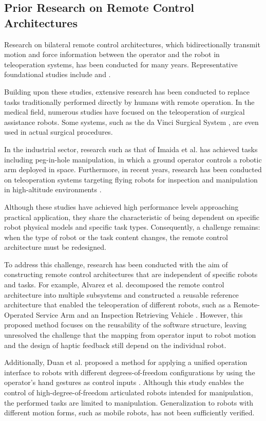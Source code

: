 \documentclass{WileyMSP-template}
\begin{document}
\subsection{Prior Research on Remote Control Architectures}

Research on bilateral remote control architectures, which bidirectionally transmit motion and force information between the operator and the robot in teleoperation systems, has been conducted for many years.
Representative foundational studies include \cite{hokayem} and \cite{anderson}.

Building upon these studies, extensive research has been conducted to replace tasks traditionally performed directly by humans with remote operation.
In the medical field, numerous studies have focused on the teleoperation of surgical assistance robots.
Some systems, such as the da Vinci Surgical System \cite{freschi}, are even used in actual surgical procedures.

In the industrial sector, research such as that of Imaida et al. \cite{imaida} has achieved tasks including peg-in-hole manipulation, in which a ground operator controls a robotic arm deployed in space.
Furthermore, in recent years, research has been conducted on teleoperation systems targeting flying robots for inspection and manipulation in high-altitude environments \cite{hou}.

Although these studies have achieved high performance levels approaching practical application, they share the characteristic of being dependent on specific robot physical models and specific task types.
Consequently, a challenge remains: when the type of robot or the task content changes, the remote control architecture must be redesigned.

To address this challenge, research has been conducted with the aim of constructing remote control architectures that are independent of specific robots and tasks.
For example, Alvarez et al. decomposed the remote control architecture into multiple subsystems and constructed a reusable reference architecture that enabled the teleoperation of different robots, such as a Remote-Operated Service Arm and an Inspection Retrieving Vehicle \cite{alvarez}.
However, this proposed method focuses on the reusability of the software structure, leaving unresolved the challenge that the mapping from operator input to robot motion and the design of haptic feedback still depend on the individual robot.

Additionally, Duan et al. proposed a method for applying a unified operation interface to robots with different degrees-of-freedom configurations by using the operator’s hand gestures as control inputs \cite{duan}.
Although this study enables the control of high-degree-of-freedom articulated robots intended for manipulation, the performed tasks are limited to manipulation.
Generalization to robots with different motion forms, such as mobile robots, has not been sufficiently verified.
\end{document}

